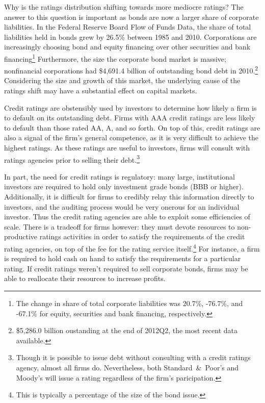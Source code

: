 \documentclass[notitlepage]{article}
\begin{document}
Why is the ratings distribution shifting towards more mediocre ratings? The answer to this question is important as bonds are now a larger share of corporate liabilities. In the Federal Reserve Board Flow of Funds Data, the share of total liabilities held in bonds grew by 26.5\% between 1985 and 2010. Corporations are increasingly choosing bond and equity financing over other securities and bank financing\footnote{The change in share of total corporate liabilities was 20.7\%, -76.7\%, and -67.1\% for equity, securities and bank financing, respectively.} Furthermore, the size the corporate bond market is massive; nonfinancial corporations had \$4,691.4 billion of outstanding bond debt in 2010.\footnote{\$5,286.0 billion oustanding at the end of 2012Q2, the most recent data available.} Considering the size and growth of this market, the underlying cause of the ratings shift may have a substantial effect on capital markets.

Credit ratings are obstensibly used by investors to determine how likely a firm is to default on its outstanding debt. Firms with AAA credit ratings are less likely to default than those rated AA, A, and so forth. On top of this, credit ratings are also a signal of the firm's general competence, as it is very difficult to achieve the highest ratings. As these ratings are useful to investors, firms will consult with ratings agencies prior to selling their debt.\footnote{Though it is possible to issue debt without consulting with a credit ratings agency, almost all firms do. Nevertheless, both Standard~\&~Poor's and Moody's will issue a rating regardless of the firm's paricipation.}

In part, the need for credit ratings is regulatory: many large, institutional investors are required to hold only investment grade bonds (BBB or higher). Additionally, it is difficult for firms to credibly relay this information directly to investors, and the auditing process would be very onerous for an individual investor. Thus the credit rating agencies are able to exploit some efficiencies of scale. There is a tradeoff for firms however: they must devote resources to non-productive ratings activities in order to satisfy the requirements of the credit rating agencies, on top of the fee for the rating service itself.\footnote{This is typically a percentage of the size of the bond issue.} For instance, a firm is required to hold cash on hand to satisfy the requirements for a particular rating. If credit ratings weren't required to sell corporate bonds, firms may be able to reallocate their resources to increase profits.
\end{document}
